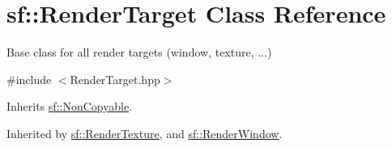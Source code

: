 \hypertarget{classsf_1_1_render_target}{\section{sf\+:\+:Render\+Target Class Reference}
\label{classsf_1_1_render_target}
}


Base class for all render targets (window, texture, ...)  




{\ttfamily \#include $<$Render\+Target.\+hpp$>$}



Inherits \hyperlink{classsf_1_1_non_copyable}{sf\+::\+Non\+Copyable}.



Inherited by \hyperlink{classsf_1_1_render_texture}{sf\+::\+Render\+Texture}, and \hyperlink{classsf_1_1_render_window}{sf\+::\+Render\+Window}.

